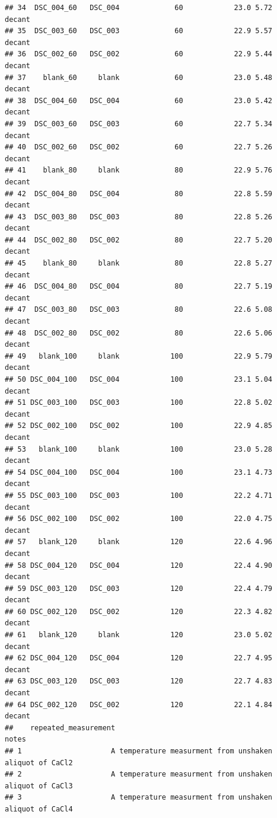 \documentclass[
]{article}
\begin{document}
\begin{verbatim}
## 34  DSC_004_60   DSC_004             60            23.0 5.72     decant
## 35  DSC_003_60   DSC_003             60            22.9 5.57     decant
## 36  DSC_002_60   DSC_002             60            22.9 5.44     decant
## 37    blank_60     blank             60            23.0 5.48     decant
## 38  DSC_004_60   DSC_004             60            23.0 5.42     decant
## 39  DSC_003_60   DSC_003             60            22.7 5.34     decant
## 40  DSC_002_60   DSC_002             60            22.7 5.26     decant
## 41    blank_80     blank             80            22.9 5.76     decant
## 42  DSC_004_80   DSC_004             80            22.8 5.59     decant
## 43  DSC_003_80   DSC_003             80            22.8 5.26     decant
## 44  DSC_002_80   DSC_002             80            22.7 5.20     decant
## 45    blank_80     blank             80            22.8 5.27     decant
## 46  DSC_004_80   DSC_004             80            22.7 5.19     decant
## 47  DSC_003_80   DSC_003             80            22.6 5.08     decant
## 48  DSC_002_80   DSC_002             80            22.6 5.06     decant
## 49   blank_100     blank            100            22.9 5.79     decant
## 50 DSC_004_100   DSC_004            100            23.1 5.04     decant
## 51 DSC_003_100   DSC_003            100            22.8 5.02     decant
## 52 DSC_002_100   DSC_002            100            22.9 4.85     decant
## 53   blank_100     blank            100            23.0 5.28     decant
## 54 DSC_004_100   DSC_004            100            23.1 4.73     decant
## 55 DSC_003_100   DSC_003            100            22.2 4.71     decant
## 56 DSC_002_100   DSC_002            100            22.0 4.75     decant
## 57   blank_120     blank            120            22.6 4.96     decant
## 58 DSC_004_120   DSC_004            120            22.4 4.90     decant
## 59 DSC_003_120   DSC_003            120            22.4 4.79     decant
## 60 DSC_002_120   DSC_002            120            22.3 4.82     decant
## 61   blank_120     blank            120            23.0 5.02     decant
## 62 DSC_004_120   DSC_004            120            22.7 4.95     decant
## 63 DSC_003_120   DSC_003            120            22.7 4.83     decant
## 64 DSC_002_120   DSC_002            120            22.1 4.84     decant
##    repeated_measurement                                                 notes
## 1                     A temperature measurment from unshaken aliquot of CaCl2
## 2                     A temperature measurment from unshaken aliquot of CaCl3
## 3                     A temperature measurment from unshaken aliquot of CaCl4

\end{verbatim}
\end{document}
